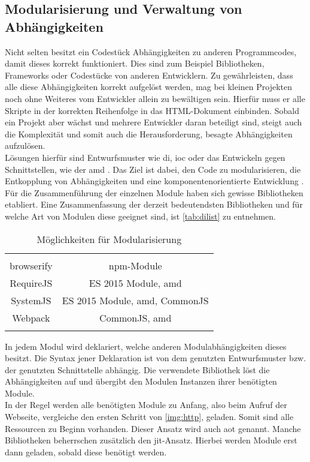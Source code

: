 \subsection{Modularisierung und Verwaltung von Abhängigkeiten}
Nicht selten besitzt ein Codestück Abhängigkeiten zu anderen Programmcodes, damit dieses korrekt funktioniert. Dies sind zum Beispiel Bibliotheken, Frameworks oder Codestücke von anderen Entwicklern. Zu gewährleisten, dass alle diese Abhängigkeiten korrekt aufgelöst werden, mag bei kleinen Projekten noch ohne Weiteres vom Entwickler allein zu bewältigen sein. Hierfür muss er alle Skripte in der korrekten Reihenfolge in das HTML-Dokument einbinden. Sobald ein Projekt aber wächst und mehrere Entwickler daran beteiligt sind, steigt auch die Komplexität und somit auch die Herausforderung, besagte Abhängigkeiten aufzulösen. \\
Lösungen hierfür sind Entwurfsmuster wie \ac{di}, \ac{ioc} \cite[S. 25 ff.]{GollDausmann2013} oder das Entwickeln gegen Schnittstellen, wie der \ac{amd} \cite[S. 266 ff.]{ste15}. Das Ziel ist dabei, den Code zu modularisieren, die Entkopplung von Abhängigkeiten und eine komponentenorientierte Entwicklung \cite[S. 261]{ste15}. Für die Zusammenführung der einzelnen Module haben sich gewisse Bibliotheken etabliert. Eine Zusammenfassung der derzeit bedeutendsten Bibliotheken und für welche Art von Modulen diese geeignet sind, ist \autoref{tab:dilist} zu entnehmen.

\newpage
\begin{longtable}{|c|c|}
	\hline  
	\thead{Bibliothek} & \thead{Geeignet für}\\  \hhline{|=|=|}
	browserify &  npm-Module \\
	\hline
	RequireJS & ES 2015 Module, \ac{amd}   \\ 
	\hline 
	SystemJS &  ES 2015 Module, \ac{amd}, CommonJS  \\ 
	\hline 
	Webpack & CommonJS, \ac{amd}   \\ 
	\hline 
	
	\caption{Möglichkeiten für Modularisierung}\label{tab:dilist}
\end{longtable}



In jedem Modul wird deklariert, welche anderen Modulabhängigkeiten dieses besitzt. Die Syntax jener Deklaration ist von dem genutzten Entwurfsmuster bzw. der genutzten Schnittstelle abhängig. Die verwendete Bibliothek löst die Abhängigkeiten auf und übergibt den Modulen Instanzen ihrer benötigten Module. \\
In der Regel werden alle benötigten Module zu Anfang, also beim Aufruf der Webseite, vergleiche den ersten Schritt von \autoref{img:http}, geladen. Somit sind alle Ressourcen zu Beginn vorhanden. Dieser Ansatz wird auch \ac{aot} genannt. Manche Bibliotheken beherrschen zusätzlich den \ac{jit}-Ansatz. Hierbei werden Module erst dann geladen, sobald diese benötigt werden.